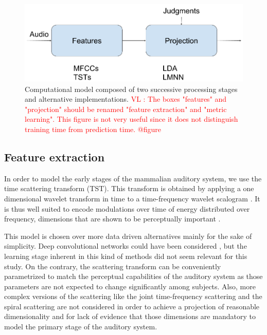 \documentclass{article}
\newcommand{\vl}[1]{\textcolor{red}{VL : #1}}
\begin{document}
\begin{figure}[t]
\center
\includegraphics[width = \textwidth]{figures/spontaneousSimilarity.png}
\caption{Computational model composed of two successive processing stages and alternative implementations.
\vl{The boxes "features" and "projection" should be renamed "feature extraction" and "metric learning".
This figure is not very useful since it does not distinguish training time from prediction time.
@figure}}
\label{fig:model}
\end{figure}

\subsection{Feature extraction}

In order to model the early stages of the mammalian auditory system, we use the time scattering transform (TST). This transform is obtained by applying a one dimensional
wavelet transform in time to a time-frequency wavelet scalogram \cite{anden2014deep}. It is thus well suited to encode modulations over time of energy distributed over frequency, dimensions that are shown to be perceptually important \cite{dau1997modeling}.

This model is chosen over more data driven alternatives mainly for the sake of simplicity. Deep convolutional networks could have been considered \cite{lee2009unsupervised}, but the learning stage inherent in this kind of methods did not seem relevant for this study. On the contrary, the scattering transform can be conveniently parametrized to match the perceptual capabilities of the auditory system as those parameters are not expected to change significantly among subjects. Also, more complex versions of the scattering like the joint time-frequency scattering \cite{anden2015joint} and the spiral scattering \cite{lostanlen2016wavelet} are not considered in order to achieve a projection of reasonable dimensionality and for lack of evidence that those dimensions are mandatory to model the primary stage of the auditory system.
\end{document}
